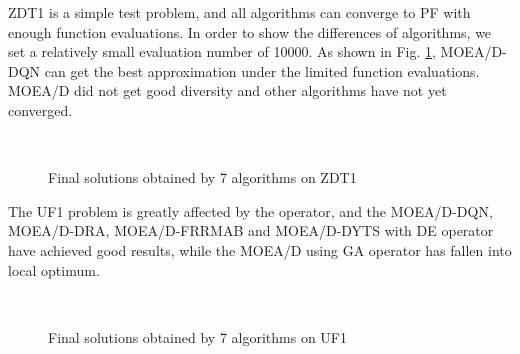 \documentclass[journal]{IEEEtran}
\begin{document}
ZDT1 is a simple test problem, and all algorithms can converge to PF with enough function evaluations. In order to show the differences of algorithms, we set a relatively small evaluation number of 10000.
As shown in Fig. \ref{fig:zdt1_pf}, MOEA/D-DQN can get the best approximation under the limited function evaluations. MOEA/D did not get good diversity and other algorithms have not yet converged.

\begin{figure}[]
    \centering
    \hfil
    \hfil
    \hfil
    \hfil
    \hfil
    \hfil
    \\
    \caption{Final solutions obtained by 7 algorithms on ZDT1}
    \label{fig:zdt1_pf}
\end{figure}


The UF1 problem is greatly affected by the operator, and the MOEA/D-DQN, MOEA/D-DRA, MOEA/D-FRRMAB and MOEA/D-DYTS with DE operator have achieved good results, while the MOEA/D using GA operator has fallen into local optimum.



\begin{figure}[]
    \centering
    \hfil
    \hfil
    \hfil
    \hfil
    \hfil
    \hfil
    \\
    \caption{Final solutions obtained by 7 algorithms on UF1}
    \label{fig:uf1_pf}
\end{figure}
\end{document}
